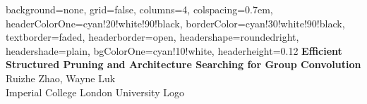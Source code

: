 \documentclass[landscape,a0paper,fontscale=0.292]{baposter}
\begin{document}
\begin{poster}{
    background=none,
    grid=false,
    columns=4,
    colspacing=0.7em,
    headerColorOne=cyan!20!white!90!black,
    borderColor=cyan!30!white!90!black,
    textborder=faded,
    headerborder=open,
    headershape=roundedright,
    headershade=plain,
    bgColorOne=cyan!10!white,
    headerheight=0.12\textheight}
    {}
    {\sc\huge\bf Efficient Structured Pruning and Architecture Searching for Group Convolution}
    {Ruizhe Zhao, Wayne Luk \\
    {Imperial College London}}
    {University Logo}


\end{poster}
\end{document}
